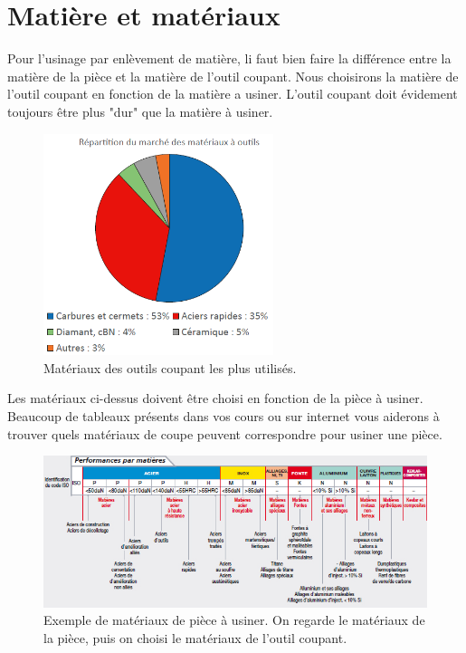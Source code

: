 \documentclass[
	11pt, %
	fleqn, %
	a4paper, %
]{LegrandOrangeBook}
\begin{document}
\section{Matière et matériaux}
Pour l'usinage par enlèvement de matière, li faut bien faire la différence entre la matière de la pièce et la matière de l'outil coupant. Nous choisirons la matière de l'outil coupant en fonction de la matière a usiner. L'outil coupant doit évidement toujours être plus "dur" que la matière à usiner.
\begin{figure}[H] %
	\centering %
	\includegraphics[width=0.6\textwidth]{Images/O1.png} %
    \caption{Matériaux des outils coupant les plus utilisés.}

	\label{fig:placeholder} %
\end{figure}

Les matériaux ci-dessus doivent être choisi en fonction de la pièce à usiner. Beaucoup de tableaux présents dans vos cours ou sur internet vous aiderons à trouver quels matériaux de coupe peuvent correspondre pour usiner une pièce.
\begin{figure}[H] %
	\centering %
	\includegraphics[width=1\textwidth]{Images/O2.jpg} %
    \caption{Exemple de matériaux de pièce à usiner. On regarde le matériaux de la pièce, puis on choisi le matériaux de l'outil coupant.}

	\label{fig:placeholder} %
\end{figure}
\end{document}
